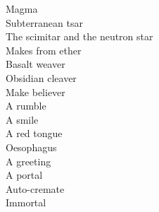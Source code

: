 Magma \\
Subterranean tsar \\
The scimitar and the neutron star \\
Makes from ether \\
Basalt weaver \\
Obsidian cleaver \\
Make believer \\

A rumble \\
A smile \\
A red tongue \\
Oesophagus \\
A greeting \\
A portal \\
Auto-cremate \\
Immortal \\

